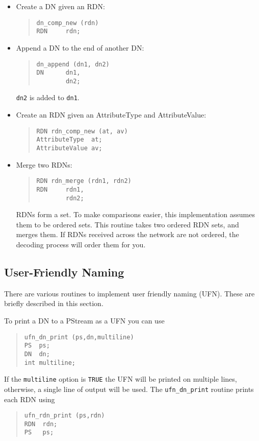 \begin{itemize}
\item Create a DN given an RDN:
\begin{quote}\small\begin{verbatim}
dn_comp_new (rdn)
RDN     rdn;
\end{verbatim}\end{quote}

\item Append a DN to the end of another DN:
\begin{quote}\small\begin{verbatim}
dn_append (dn1, dn2)
DN      dn1,
        dn2;
\end{verbatim}\end{quote}
\verb"dn2" is added to \verb"dn1".

\item Create an RDN given an AttributeType and AttributeValue:
\begin{quote}\small{}\begin{verbatim}
RDN rdn_comp_new (at, av)
AttributeType  at;
AttributeValue av;
\end{verbatim}\end{quote}

\item Merge two RDNs:
\begin{quote}\small{}\begin{verbatim}
RDN rdn_merge (rdn1, rdn2)
RDN     rdn1,
        rdn2;
\end{verbatim}\end{quote}
RDNs form a set. To make comparisons easier, this
implementation assumes them to be ordered sets.  This routine
takes two ordered RDN sets, and merges them.
If RDNs received across the network are not ordered, the decoding
process will order them for you.
\end{itemize}

\subsection {User-Friendly Naming}
\label{UFN}
There are various routines to implement user friendly naming (UFN)\cite{UFN}.
These are briefly described in this section.

To print a DN to a PStream as a UFN you can use
\begin{quote}\small{}\begin{verbatim}
ufn_dn_print (ps,dn,multiline)
PS  ps;
DN  dn;
int multiline;
\end{verbatim}\end{quote}
If the \verb+multiline+ option is \verb+TRUE+ the UFN will be printed
on multiple lines, otherwise, a single line of output will be used.
The \verb+ufn_dn_print+ routine prints each RDN using
\begin{quote}\small\begin{verbatim}
ufn_rdn_print (ps,rdn)
RDN  rdn;
PS   ps;
\end{verbatim}\end{quote}

